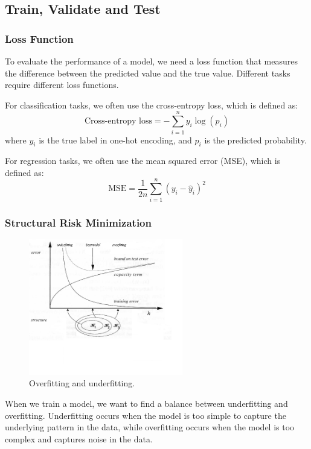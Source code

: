 \documentclass[a4paper,12pt]{article}
\begin{document}
\subsection{Train, Validate and Test}

\subsubsection{Loss Function}

To evaluate the performance of a model, we need a loss function that measures the difference between the predicted value and the true value. Different tasks require different loss functions.

For classification tasks, we often use the cross-entropy loss, which is defined as:
\begin{equation*}
  \text{Cross-entropy loss} = -\sum_{i=1}^{n} y_i \log(p_i)
\end{equation*}
where $y_i$ is the true label in one-hot encoding, and $p_i$ is the predicted probability.

For regression tasks, we often use the mean squared error (MSE), which is defined as:
\begin{equation*}
  \text{MSE} = \frac{1}{2n} \sum_{i=1}^{n} (y_i - \hat{y}_i)^2
\end{equation*}

\subsubsection{Structural Risk Minimization}

\begin{figure}[H]
  \centering
  \includegraphics[width=0.6\textwidth]{figure/Sewell2006.png}
  \caption{Overfitting and underfitting.}
\end{figure}

When we train a model, we want to find a balance between underfitting and overfitting. Underfitting occurs when the model is too simple to capture the underlying pattern in the data, while overfitting occurs when the model is too complex and captures noise in the data.
\end{document}
